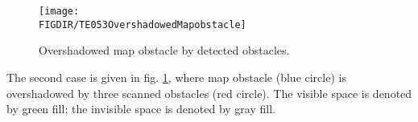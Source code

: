 \begin{figure}[htbp]
    \centering
    \texttt{[image: \\FIGDIR/TE053OvershadowedMapobstacle]}
    \caption{Overshadowed map obstacle by detected obstacles.}
    \label{fig:P02OvershadowedMapobstacle}

\end{figure}
\noindent The second case is given in fig. \ref{fig:P02OvershadowedMapobstacle}, where map obstacle (blue circle) is overshadowed by three scanned obstacles (red circle). The visible space is denoted by green fill; the invisible space is denoted by gray fill. 